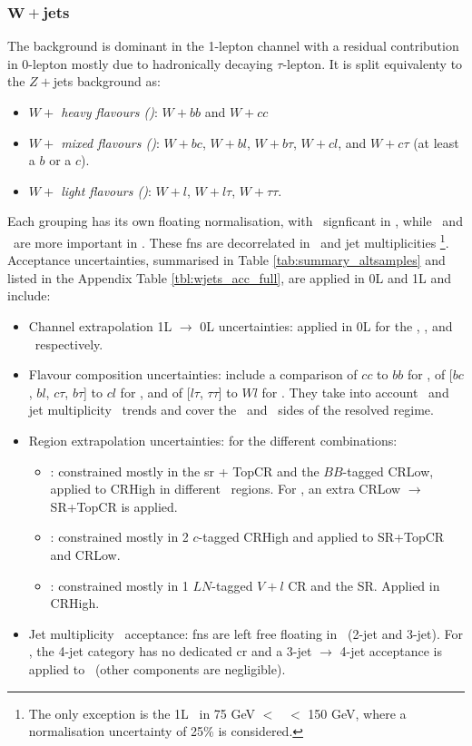 \subsubsection{$\boldsymbol{W+}$jets}
The background is dominant in the 1-lepton channel with a residual contribution in 0-lepton mostly due to hadronically decaying $\tau$-lepton. It is split equivalenty to the $Z+$jets background as:   
\begin{itemize}
    \item \textit{$W+$ heavy flavours (\whf)}: $W+bb$ and $W+cc$
    \item \textit{$W+$ mixed flavours (\wmf)}: $W+bc$, $W+bl$, $W+b\tau$, $W+cl$, and $W+c\tau$ (at least a $b$ or a $c$).
    \item \textit{$W+$ light flavours (\wlf)}: $W+l$, $W+l\tau$, $W+\tau\tau$.
\end{itemize}
Each grouping has its own floating normalisation, with \whf\ signficant in \vhb, while \wmf\ and \wlf\ are more important in \vhc. These \gls{fn}s are decorrelated in \ptv\ and jet multiplicities \nj\footnote{The only exception is the 1L \wlf\ in 75 GeV $<$ \ptv\ $<$ 150 GeV, where a normalisation uncertainty of 25\% is considered.}. Acceptance uncertainties, summarised in Table \ref{tab:summary_altsamples} and listed in the Appendix Table \ref{tbl:wjets_acc_full}, are applied in 0L and 1L and include:
\begin{itemize}[leftmargin=*]
    \item Channel extrapolation 1L $\rightarrow$ 0L uncertainties: applied in 0L for the \whf, \wmf, and \wlf\ respectively. 
    \item Flavour composition uncertainties: include a comparison of $cc$ to $bb$ for \whf, of [$bc$, $bl$, $c\tau$, $b\tau$] to $cl$ for \wmf, and of [$l\tau$, $\tau\tau$] to $Wl$ for \wlf. They take into account \ptv\ and jet multiplicity \nj\ trends and cover the \vhb\ and \vhc\ sides of the resolved regime. 
    \item Region extrapolation uncertainties: for the different combinations:
    \begin{itemize}
        \item \whf: constrained mostly in the \gls{sr} + TopCR and the $BB$-tagged CRLow, applied to CRHigh in different \ptv\ regions. For \vhb, an extra CRLow $\rightarrow$ SR+TopCR is applied. 
        \item \wmf: constrained mostly in 2 $c$-tagged CRHigh and applied to SR+TopCR and CRLow.
        \item \wlf: constrained mostly in 1 $LN$-tagged $V+l$ CR and the SR. Applied in CRHigh. %
    \end{itemize}
    \item Jet multiplicity \nj\ acceptance: \gls{fn}s are left free floating in \nj\ (2-jet and 3-jet). For \vhb, the 4-jet category has no dedicated \gls{cr} and a 3-jet $\rightarrow$ 4-jet acceptance is applied to \whf\ (other components are negligible).
\end{itemize}

